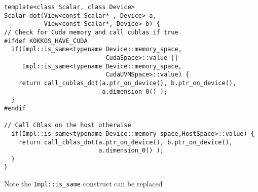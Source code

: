 \begin{lstlisting}
template<class Scalar, class Device>
Scalar dot(View<const Scalar* , Device> a, 
           View<const Scalar*, Device> b) {
// Check for Cuda memory and call cublas if true
#ifdef KOKKOS_HAVE_CUDA
  if(Impl::is_same<typename Device::memory_space,
                            CudaSpace>::value ||
     Impl::is_same<typename Device::memory_space,
                            CudaUVMSpace>::value) {
    return call_cublas_dot(a.ptr_on_device(), b.ptr_on_device(),
                           a.dimension_0() );
  }
#endif

// Call CBlas on the host otherwise
  if(Impl::is_same<typename Device::memory_space,HostSpace>::value) {
    return call_cblas_dot(a.ptr_on_device(), b.ptr_on_device(),
                          a.dimension_0() );
  }
}
\end{lstlisting}

Note the \lstinline|Impl::is_same| construct can be replaced
